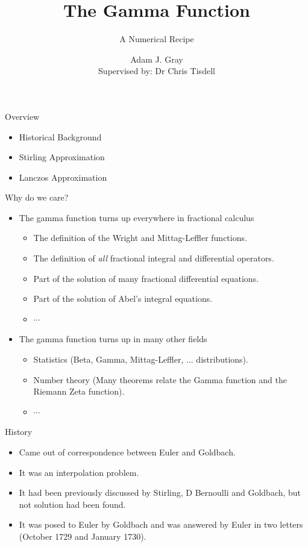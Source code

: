 \documentclass[pdf]{beamer}
\title{The Gamma Function}
\subtitle{A Numerical Recipe}
\author[Adam J. Gray]{Adam J. Gray\\{\small Supervised by: Dr Chris Tisdell}}
\institute{
	School of Mathematics and Statistics \\
	University of New South Wales
}
\begin{document}
\begin{frame}
	\titlepage
\end{frame}


\begin{frame}{Overview}
    \begin{itemize}    
        \item Historical Background \\
        \item Stirling Approximation \\
        \item Lanczos Approximation \\
    \end{itemize}
\end{frame}

\begin{frame}{Why do we care?}
    \begin{itemize}
        \item The gamma function turns up everywhere in fractional calculus
        \begin{itemize}
            \item The definition of the Wright and Mittag-Leffler functions.
            \item The definition of \emph{all} fractional integral and differential operators.
            \item Part of the solution of many fractional differential equations.
            \item Part of the solution of Abel's integral equations.
            \item $\cdots$ 
        \end{itemize} 
        \item The gamma function turns up in many other fields
        \begin{itemize}
            \item Statistics (Beta, Gamma, Mittag-Leffler, ... distributions).
            \item Number theory (Many theorems relate the Gamma function and the Riemann Zeta function).
            \item $ \cdots $
        \end{itemize}
    \end{itemize}
\end{frame}

\begin{frame}{History}
    \begin{itemize}
        \item Came out of correspondence between Euler and Goldbach. 
        \item It was an interpolation problem.
        \item It had been previously discussed by Stirling, D Bernoulli and Goldbach, but not solution had been found.
        \item It was posed to Euler by Goldbach and was answered by Euler in two letters (October 1729 and January 1730).
    \end{itemize} 
\end{frame}
\end{document}
